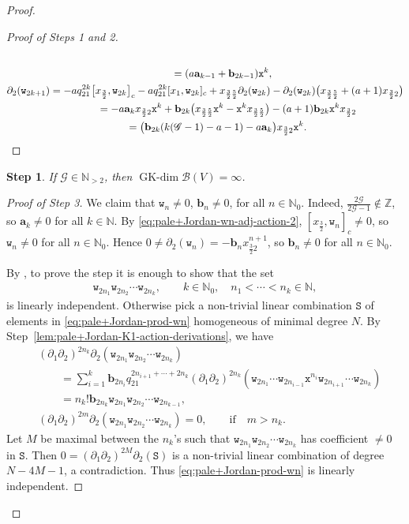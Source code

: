 \documentclass[10pt,a4paper]{amsart}
\numberwithin{equation}{section}
\newtheorem{stepiv}{Step}
\newcommand{\GK}{\operatorname{GK-dim}}
\newcommand{\toba}{\mathscr B}
\newcommand{\ghost}{\mathscr{G}}
\newcommand{\ab}{\mathbf a}
\newcommand{\bb}{\mathbf b}
\newcommand{\N}{{\mathbb N}}
\newcommand{\Z}{{\mathbb Z}}
\newcommand{\wt}{\mathtt{w}}
\newcommand{\xt}{\mathtt{x}}
\newcommand{\tresdos}{\frac{3}{2}}
\newcommand{\cincodos}{\frac{5}{2}}
\begin{document}
\begin{proof}
\begin{proof}[Proof of Steps 1 and 2]
\begin{gather*}
\\\hphantom{\partial_{2} (\wt_{2k})}
{}= (a\ab_{k-1} +\bb_{2k-1}) \xt^{k},
\\
\partial_{2} (\wt_{2k+1}) =
-aq_{21}^{2k}\big[x_{\tresdos},\wt_{2k}\big]_c
-aq_{21}^{2k}[x_1,\wt_{2k}]_c
+x_{\tresdos\cincodos}\partial_2(\wt_{2k})
-\partial_2(\wt_{2k}) \big(x_{\tresdos\cincodos}+(a+1)x_{\tresdos2}\big)
\\ \hphantom{\partial_{2} (\wt_{2k+1})}
{} = -a\ab_k x_{\tresdos2}\xt^{k}
+\bb_{2k} \big(x_{\tresdos\cincodos}\xt^{k}-\xt^{k} x_{\tresdos\cincodos}\big)
-(a+1)\bb_{2k} \xt^{k}x_{\tresdos2}
\\ \hphantom{\partial_{2} (\wt_{2k+1})}
{} = \big(\bb_{2k} (k(\ghost-1)-a-1) -a\ab_k\big) x_{\tresdos2}\xt^{k}.
\tag*{\qed}
\end{gather*}
\renewcommand{\qed}{}
\end{proof}


\begin{stepiv}\label{prop:pale+Jordan}
If $\ghost\in\N_{>2}$, then $\GK \toba(V)=\infty$.
\end{stepiv}

\begin{proof}[Proof of Step 3]
We claim that
$\wt_n \ne 0$, $\bb_n \ne 0$, for all $n\in\N_0$.
Indeed, $\tfrac{2\ghost}{2\ghost-1}\notin\Z$, so $\ab_k\ne 0$ for all $k\in\N$.
By \eqref{eq:pale+Jordan-wn-adj-action-2}, $[x_{\tresdos},\wt_n]_c\ne 0$, so $\wt_n \ne 0$ for all $n\in\N_0$. Hence
$0\ne \partial_2(\wt_n)= -\bb_n x_{\tresdos2}^{n+1}$, so $\bb_{n}\ne 0$ for all $n\in\N_0$.

By \cite[Lemma~2.3.4]{AAH-triang}, to prove the step it is enough to show that the set
\begin{align}\label{eq:pale+Jordan-prod-wn}
 \wt_{2n_1}\wt_{2n_2}\cdots \wt_{2n_k},\qquad
 k\in\mathbb N_0, \quad n_1< \cdots< n_k \in\N,
\end{align}
is linearly independent.
Otherwise pick a non-trivial linear combination $\mathtt S$ of elements in \eqref{eq:pale+Jordan-prod-wn}
homogeneous of minimal degree $N$. By Step~\ref{lem:pale+Jordan-K1-action-derivations}, we have
\begin{align*}
&(\partial_1\partial_2)^{2n_k}\partial_2 (\wt_{2n_1}\wt_{2n_2}\cdots \wt_{2n_k})
\\
&\qquad{}= \sum_{i=1}^k \bb_{2n_i}q_{21}^{2n_{i+1}+\cdots +2n_k} (\partial_1\partial_2)^{2n_k} (\wt_{2n_1}\cdots \wt_{2n_{i-1}} \xt^{n_i}\wt_{2n_{i+1}}\cdots \wt_{2n_k})
\\
&\qquad{} = n_k! \bb_{2n_k} \wt_{2n_1}\wt_{2n_2}\cdots \wt_{2n_{k-1}},
\\
&(\partial_1\partial_2)^{2m}\partial_2 (\wt_{2n_1}\wt_{2n_2}\cdots \wt_{2n_k}) =0, \qquad
\text{if}\quad m>n_k.
\end{align*}
Let $M$ be maximal between the $n_k$'s such that $\wt_{2n_1}\wt_{2n_2}\cdots \wt_{2n_k}$ has
coefficient $\neq 0$ in $\mathtt S$.
Then $0=(\partial_1\partial_2)^{2M}\partial_2(\mathtt S)$ is a non-trivial linear combination of degree $N-4M-1$,
a contradiction. Thus \eqref{eq:pale+Jordan-prod-wn} is linearly independent.
\end{proof}


\end{proof}
\end{document}
